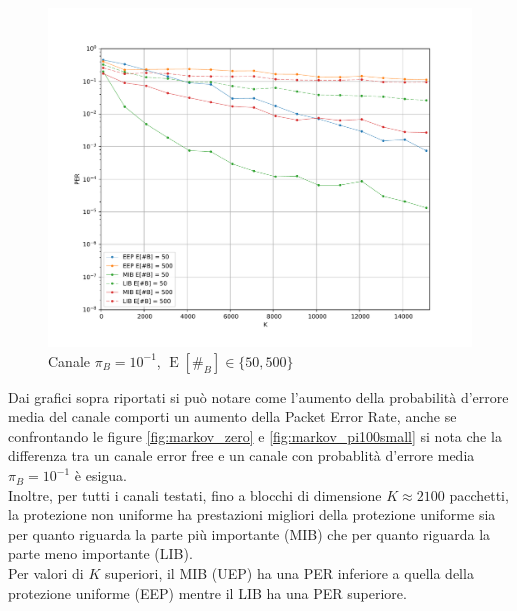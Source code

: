 \documentclass[italian, a4paper, 12pt]{article}
\newcommand{\E}[1]{\operatorname{E}\left[#1\right]}
\newcommand{\EnB}{\E{\#_B}}
\begin{document}
\begin{figure}[H]
  \centering
  \includegraphics[width=\textwidth]{plot_markov_pi10big}
  \caption{Canale $\pi_B = 10^{-1}$, $\EnB \in \{50, 500\}$}
  \label{fig:markov_pi10big}
\end{figure}
Dai grafici sopra riportati si può notare come l'aumento della probabilità d'errore
media del canale comporti un aumento della Packet Error Rate, anche se confrontando le
figure \ref{fig:markov_zero} e \ref{fig:markov_pi100small} si nota che la differenza tra un canale
error free e un canale con probablità d'errore media $\pi_B = 10^{-1}$ è esigua.\\
Inoltre, per tutti i canali testati, fino a blocchi di dimensione $K \approx 2100$ pacchetti,
la protezione non uniforme ha
prestazioni migliori della protezione uniforme sia per quanto riguarda la
parte più importante (MIB) che per quanto riguarda la parte meno importante (LIB).\\
Per valori di $K$ superiori, il MIB (UEP) ha una PER inferiore a quella della protezione uniforme (EEP)
mentre il LIB ha una PER superiore.\\

%
%
\end{document}
